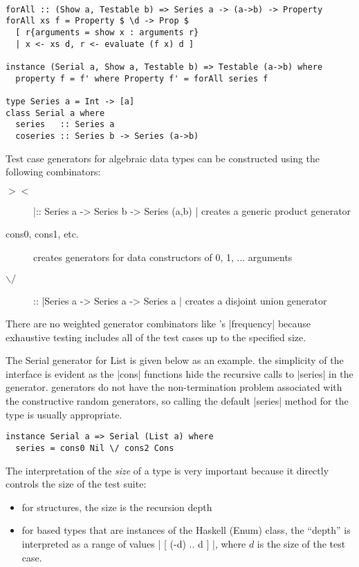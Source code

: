 \begin{lstlisting}

forAll :: (Show a, Testable b) => Series a -> (a->b) -> Property
forAll xs f = Property $ \d -> Prop $
  [ r{arguments = show x : arguments r}
  | x <- xs d, r <- evaluate (f x) d ]

instance (Serial a, Show a, Testable b) => Testable (a->b) where
  property f = f' where Property f' = forAll series f

type Series a = Int -> [a]
class Serial a where
  series   :: Series a
  coseries :: Series b -> Series (a->b)

\end{lstlisting}

Test case generators for algebraic data types can be constructed using the following combinators:

\begin{description}
\item [ $><$ ] |:: Series a -> Series b -> Series (a,b) | creates a generic product generator
\item [ cons0, cons1, etc.] creates generators for data constructors of 0, 1, ... arguments
\item [$\backslash/$] :: |Series a -> Series a -> Series a | creates a disjoint union generator
\end{description}

\noindent There are no weighted generator combinators like \QC's |frequency|
because exhaustive testing includes all of the test cases up to the specified size.

The Serial generator for List is given below as an example.
the simplicity of the interface is evident as the |cons| functions
hide the recursive calls to |series| in the generator.
\SC generators do not have the non-termination problem 
associated with the \QC constructive random generators,
so calling the default |series| method for the type is usually appropriate.

\begin{lstlisting}
instance Serial a => Serial (List a) where
  series = cons0 Nil \/ cons2 Cons
\end{lstlisting}

The interpretation of the \emph{size} of a type is very important
because it directly controls the size of the test suite:

\begin{itemize}
\item for structures, the size is the recursion depth
\item for based types that are instances of the Haskell (Enum) class,
the ``depth'' is interpreted as a range of values  | [ (-d) .. d ] |,
where $d$ is the size of the test case.
\end{itemize}

